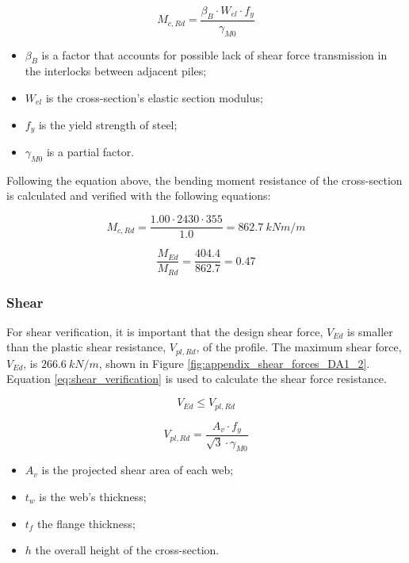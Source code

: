 \begin{equation}
    M_{c,Rd} = \frac{\beta_{B} \cdot W_{el} \cdot f_{y}}{\gamma_{M0}}
    \label{eq:bending_plastic}
\end{equation}

\begin{itemize}
  \item $\beta_B$ is a factor that accounts for possible lack of shear force transmission in the interlocks between adjacent piles;
  \item $W_{el}$ is the cross-section’s elastic section modulus;
  \item $f_y$ is the yield strength of steel;
  \item $\gamma_{M0}$ is a partial factor.
\end{itemize}

Following the equation above, the bending moment resistance of the cross-section is calculated and verified with the following equations:

\begin{equation}
    M_{c,Rd} = \frac{1.00 \cdot 2430 \cdot 355}{1.0} = 862.7 \ kNm/m
\end{equation}

\begin{equation}
    \frac{M_{Ed}}{M_{Rd}} = \frac{404.4}{862.7} = 0.47
\end{equation}

\subsubsection{Shear}

For shear verification, it is important that the design shear force, $V_{Ed}$ is smaller than the plastic shear resistance, $V_{pl,Rd}$, of the profile. The maximum shear force, $V_{Ed}$, is $266.6 \ kN/m$, shown in Figure \ref{fig:appendix_shear_forces_DA1_2}. Equation \ref{eq:shear_verification} is used to calculate the shear force resistance.

\begin{equation}
    V_{Ed} \leq V_{pl,Rd}
    \label{eq:shear_plastic}
\end{equation}

\begin{equation}
    V_{pl,Rd} = \frac{A_v \cdot f_{y}}{\sqrt{3} \cdot \gamma_{M0}}
    \label{eq:shear_verification}
\end{equation}

\begin{itemize}
    \item $A_{v}$ is the projected shear area of each web;
    \item $t_w$ is the web’s thickness;
    \item $t_f$ the flange thickness;
    \item $h$ the overall height of the cross-section.
\end{itemize}

